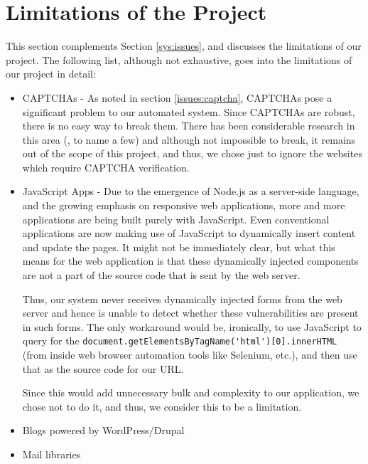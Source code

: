 \section[Limitations]{Limitations of the Project}
	This section complements Section \ref{sys:issues}, and discusses the limitations of our project. The following list, although not exhaustive, goes into the limitations of our project in detail: 
	\begin{itemize}
		\item CAPTCHAs - As noted in section \ref*{issues:captcha}, CAPTCHAs pose a significant problem to our automated system. Since CAPTCHAs are robust, there is no easy way to break them. There has been considerable research in this area (\cite{captchas}, \cite{captchas2} to name a few) and although not impossible to break, it remains out of the scope of this project, and thus, we chose just to ignore the websites which require CAPTCHA verification.
		\item JavaScript Apps - Due to the emergence of Node.js as a server-side language, and the growing emphasis on responsive web applications, more and more applications are being built purely with JavaScript. Even conventional applications are now making use of JavaScript to dynamically insert content and update the pages. It might not be immediately clear, but what this means for the web application is that these dynamically injected components are not a part of the source code that is sent by the web server.
		
		Thus, our system never receives dynamically injected forms from the web server and hence is unable to detect whether these vulnerabilities are present in such forms. The only workaround would be, ironically, to use JavaScript to query for the \lstinline|document.getElementsByTagName('html')[0].innerHTML| (from inside web browser automation tools like Selenium, etc.), and then use that as the source code for our URL.
		
		Since this would add unnecessary bulk and complexity to our application, we chose not to do it, and thus, we consider this to be a limitation.
		\item Blogs powered by WordPress/Drupal
		\item Mail libraries
	\end{itemize}